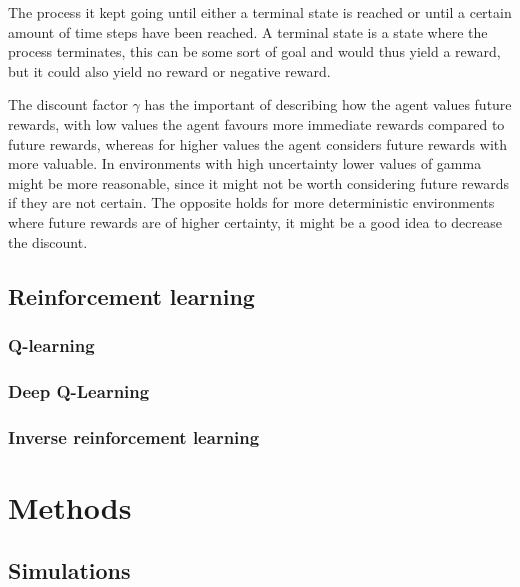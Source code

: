 \documentclass{report}
\theoremstyle{definition}
\begin{document}
The process it kept going until either a terminal state is reached or until a certain amount of time steps have been reached. A terminal state is a state where the process terminates, this can be some sort of goal and would thus yield a reward, but it could also yield no reward or negative reward.

The discount factor $\gamma$ has the important of describing how the agent values future rewards, with low values the agent favours more immediate rewards compared to future rewards, whereas for higher values the agent considers future rewards with more valuable. In environments with high uncertainty lower values of gamma might be more reasonable, since it might not be worth considering future rewards if they are not certain. The opposite holds for more deterministic environments where future rewards are of higher certainty, it might be a good idea to decrease the discount.


\section{Reinforcement learning}

\subsection{Q-learning}

\subsection{Deep Q-Learning}

\subsection{Inverse reinforcement learning}




\chapter{Methods}

\section{Simulations}
\end{document}
